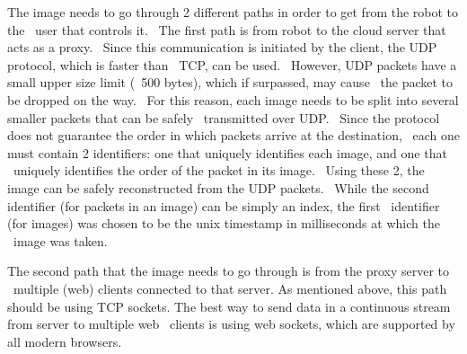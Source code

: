  The image needs to go through 2 different paths in order to get from the robot to the \
user that controls it. \
The first path is from robot to the cloud server that acts as a proxy. \
Since this communication is initiated by the client, the UDP protocol, which is faster than \
TCP, can be used. \
However, UDP packets have a small upper size limit (~500 bytes), which if surpassed, may cause \
the packet to be dropped on the way. \
For this reason, each image needs to be split into several smaller packets that can be safely \
transmitted over UDP. \
Since the protocol does not guarantee the order in which packets arrive at the destination, \
each one must contain 2 identifiers: one that uniquely identifies each image, and one that \
uniquely identifies the order of the packet in its image. \
Using these 2, the image can be safely reconstructed from the UDP packets. \
While the second identifier (for packets in an image) can be simply an index, the first \
identifier (for images) was chosen to be the unix timestamp in milliseconds at which the \
image was taken.

The second path that the image needs to go through is from the proxy server to \
multiple (web) clients connected to that server.
As mentioned above, this path should be using TCP sockets.
The best way to send data in a continuous stream from server to multiple web \
clients is using web sockets, which are supported by all modern browsers.

